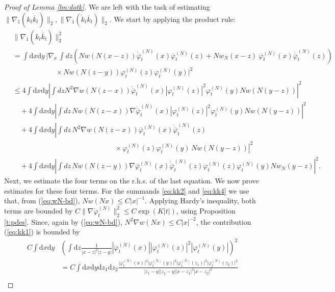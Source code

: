\documentclass[11pt,a4paper,DIV11]{scrartcl}	%
\newcommand{\di}{\textrm{d}}		%
\newcommand{\cc}[1]{\overline{#1}}	%
\newcommand{\norm}[1]{\lVert#1\rVert}	%
\newcommand{\ph}{\varphi_t^{(N)}}	%
\newcommand{\phdot}{\dot{\varphi}_t^{(N)}}	%
\begin{document}
\begin{proof}[Proof of Lemma \ref{lm:dotk}]
We are left with the task of estimating $\| \nabla_1 (k_t \dot{\overline{k}}_t) \|_2, \| \nabla_1 (\dot k_t \overline{k}_t) \|_2$. We start by applying the product rule:
\begin{align}
& \norm{\nabla_1 (k_t \dot{\overline{k}}_t)}_2^2  \nonumber \\
& = \int \di x \di y \, \bigg\lvert \nabla_x \, \int dz \left( N w(N(x-z)) \dot{\cc{\varphi}}_t^{(N)} (x) \cc{\varphi}_t^{(N)} (z) + N w_N(x-z)\ \cc{\varphi}_t^{(N)} (x) \dot{\cc{\varphi}}_t^{(N)} (z) \right) \nonumber \\
& \qquad\qquad\qquad \times N w(N(z-y)) {\ph(z)} {\ph(y)} \bigg\rvert^2 \nonumber \\
& \leq 4 \int \di x \di y \left\lvert \int dz N^2 \nabla w (N(z-x)) \dot{\cc{\varphi}}_t^{(N)} (x)  |\ph(z)|^2  \ph(y) N w (N(y-z)) \right|^2 \label{eq:kk1} \\
& \quad + 4 \int \di x \di y \left| \int dz \, N w (N(z-x)) \nabla \dot{\cc{\varphi}}_t^{(N)} (x) |\ph(z)|^2 \ph(y) N w (N(y-z)) \right|^2 \label{eq:kk2}\\
& \quad + 4 \int \di x \di y \left| \int dz \, N^2 \nabla w (N(z-x)) \cc{\varphi}_t^{(N)} (x) \dot{\cc{\varphi}}_t^{(N)} (z) \right. \nonumber \\ & \left. \hspace{6cm} \times \ph(z)  \ph(y) \, N w (N(y-z)) \right|^2 \label{eq:kk3}\\
& \quad + 4 \int \di x \di y \left| \int dz \, N w(N(z-y)) \nabla \cc{\varphi}_t^{(N)} (x) \dot{\cc{\varphi}}_t^{(N)} (z) \ph(z) \ph(y) N w_N(y-z) \right|^2. \label{eq:kk4}
\end{align}
Next, we estimate the four terms on the r.h.s. of the last equation. 
We now prove estimates for these four terms. For the summands \eqref{eq:kk2} and \eqref{eq:kk4} we use that, from (\ref{eq:wN-bd}), $N w(Nx) \leq C |x|^{-1}$. Applying Hardy's inequality, both terms are bounded by $C \norm{\nabla \phdot}_{2}^2 \leq C \exp (K |t|)$, using Proposition \ref{t:pdes}. Since, again by (\ref{eq:wN-bd}), $N^2 \nabla w (Nx)\leq C |x|^{-2}$, the contribution (\ref{eq:kk1}) is bounded by 
\begin{align*}
C \int \di x \di y &\left( \int \di z \frac{1}{|x-z|^2 |z-y|} |\dot{\varphi}_t^{(N)} (x)| |\ph(z)|^2 |\ph(y)|  \right)^2 \\
& = C \int \di x \di y \di z_1 \di z_2 \frac{\lvert\phdot(x)\rvert^2 \lvert \ph(y)\rvert^2 \lvert \ph(z_1)\rvert^2 \lvert \ph(z_2)\rvert^2}{\lvert z_1-y\rvert \lvert z_2 -y\rvert \lvert x-z_1\rvert^2 \lvert x-z_2\rvert^2} \\

\end{align*}
\end{proof}
\end{document}
